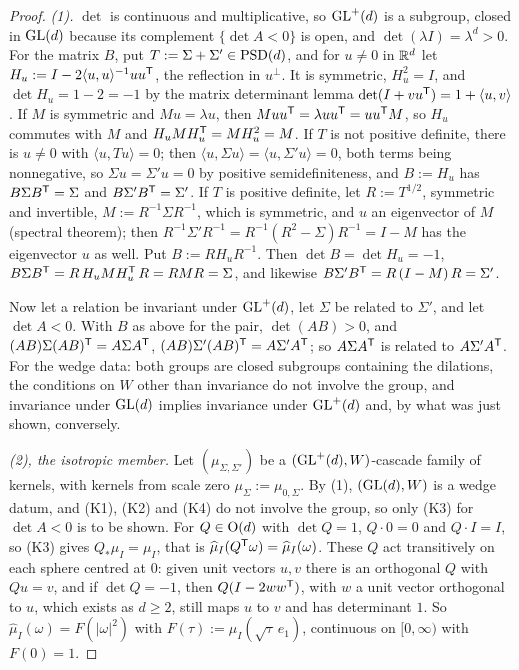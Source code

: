\begin{proof}
\leanok
\emph{(1).} $\det$ is continuous and multiplicative, so $\mathrm{GL}^+(d)$ is a subgroup, closed in $\mathrm{GL}(d)$
because its complement $\{\det A < 0\}$ is open, and $\det(\lambda I) = \lambda^d > 0$. For the matrix
$B$, put $T := \Sigma + \Sigma' \in \mathrm{PSD}(d)$, and for $u \ne 0$ in $\mathbb{R}^d$ let
$H_u := I - 2\langle u, u\rangle^{-1}uu^{\mathsf{T}}$, the reflection in $u^\perp$. It is symmetric, $H_u^2 = I$,
and $\det H_u = 1 - 2 = -1$ by the matrix determinant lemma $\det(I + vu^{\mathsf{T}}) = 1 + \langle u, v\rangle$.
If $M$ is symmetric and $Mu = \lambda u$, then $Muu^{\mathsf{T}} = \lambda uu^{\mathsf{T}} = uu^{\mathsf{T}}M$, so $H_u$
commutes with $M$ and $H_uMH_u^{\mathsf{T}} = MH_u^2 = M$. If $T$ is not positive definite, there is $u \ne 0$
with $\langle u, Tu\rangle = 0$; then $\langle u, \Sigma u\rangle = \langle u, \Sigma'u\rangle = 0$, both
terms being nonnegative, so $\Sigma u = \Sigma'u = 0$ by positive semidefiniteness, and $B := H_u$ has
$B\Sigma B^{\mathsf{T}} = \Sigma$ and $B\Sigma'B^{\mathsf{T}} = \Sigma'$. If $T$ is positive definite, let
$R := T^{1/2}$, symmetric and invertible, $M := R^{-1}\Sigma R^{-1}$, which is symmetric, and $u$ an
eigenvector of $M$ (spectral theorem); then $R^{-1}\Sigma'R^{-1} = R^{-1}(R^2 - \Sigma)R^{-1} = I - M$
has the eigenvector $u$ as well. Put $B := RH_uR^{-1}$. Then $\det B = \det H_u = -1$,
$B\Sigma B^{\mathsf{T}} = R\,H_uMH_u^{\mathsf{T}}\,R = RMR = \Sigma$, and likewise
$B\Sigma'B^{\mathsf{T}} = R\,(I - M)\,R = \Sigma'$.

Now let a relation be invariant under $\mathrm{GL}^+(d)$, let $\Sigma$ be related to $\Sigma'$, and let
$\det A < 0$. With $B$ as above for the pair, $\det(AB) > 0$, and $(AB)\Sigma(AB)^{\mathsf{T}} =
A\Sigma A^{\mathsf{T}}$, $(AB)\Sigma'(AB)^{\mathsf{T}} = A\Sigma'A^{\mathsf{T}}$; so $A\Sigma A^{\mathsf{T}}$ is related to
$A\Sigma'A^{\mathsf{T}}$. For the wedge data: both groups are closed subgroups containing the dilations, the
conditions on $W$ other than invariance do not involve the group, and invariance under $\mathrm{GL}(d)$
implies invariance under $\mathrm{GL}^+(d)$ and, by what was just shown, conversely.

\emph{(2), the isotropic member.} Let $(\mu_{\Sigma,\Sigma'})$ be a $(\mathrm{GL}^+(d), W)$-cascade family of
kernels, with kernels from scale zero $\mu_\Sigma := \mu_{0,\Sigma}$. By (1), $(\mathrm{GL}(d), W)$ is a wedge
datum, and (K1), (K2) and (K4) do not involve the group, so only (K3) for $\det A < 0$ is to be shown.
For $Q \in \mathrm{O}(d)$ with $\det Q = 1$, $Q \cdot 0 = 0$ and $Q \cdot I = I$, so (K3) gives
$Q_*\mu_I = \mu_I$, that is $\widehat\mu_I(Q^{\mathsf{T}}\omega) = \widehat\mu_I(\omega)$. These $Q$ act transitively on
each sphere centred at $0$: given unit vectors $u, v$ there is an orthogonal $Q$ with $Qu = v$, and if
$\det Q = -1$, then $Q(I - 2ww^{\mathsf{T}})$, with $w$ a unit vector orthogonal to $u$, which exists as
$d \ge 2$, still maps $u$ to $v$ and has determinant $1$. So $\widehat\mu_I(\omega) = F(|\omega|^2)$ with
$F(\tau) := \widehat\mu_I(\sqrt\tau\,e_1)$, continuous on $[0,\infty)$ with $F(0) = 1$.


\end{proof}
